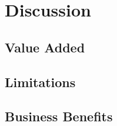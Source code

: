 \chapter{Discussion}

\section{Value Added}

\section{Limitations}




\section{Business Benefits}

